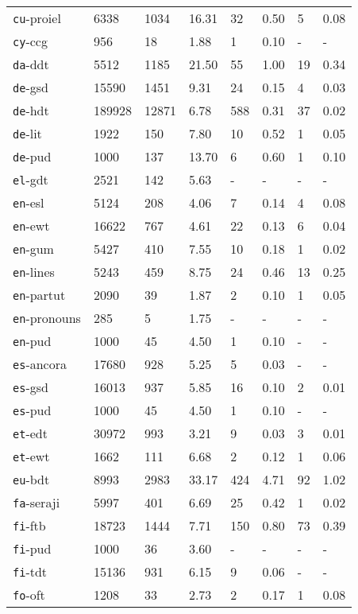 \begin{longtable}{|l|l|l|l|l|l|l|l|}
\texttt{cu}-proiel & 6338 & 1034 & 16.31 & 32 & 0.50 & 5 & 0.08\\
\texttt{cy}-ccg & 956 & 18 & 1.88 & 1 & 0.10 & - & -\\
\texttt{da}-ddt & 5512 & 1185 & 21.50 & 55 & 1.00 & 19 & 0.34\\
\texttt{de}-gsd & 15590 & 1451 & 9.31 & 24 & 0.15 & 4 & 0.03\\
\texttt{de}-hdt & 189928 & 12871 & 6.78 & 588 & 0.31 & 37 & 0.02\\
\texttt{de}-lit & 1922 & 150 & 7.80 & 10 & 0.52 & 1 & 0.05\\
\texttt{de}-pud & 1000 & 137 & 13.70 & 6 & 0.60 & 1 & 0.10\\
\texttt{el}-gdt & 2521 & 142 & 5.63 & - & - & - & -\\
\texttt{en}-esl & 5124 & 208 & 4.06 & 7 & 0.14 & 4 & 0.08\\
\texttt{en}-ewt & 16622 & 767 & 4.61 & 22 & 0.13 & 6 & 0.04\\
\texttt{en}-gum & 5427 & 410 & 7.55 & 10 & 0.18 & 1 & 0.02\\
\texttt{en}-lines & 5243 & 459 & 8.75 & 24 & 0.46 & 13 & 0.25\\
\texttt{en}-partut & 2090 & 39 & 1.87 & 2 & 0.10 & 1 & 0.05\\
\texttt{en}-pronouns & 285 & 5 & 1.75 & - & - & - & -\\
\texttt{en}-pud & 1000 & 45 & 4.50 & 1 & 0.10 & - & -\\
\texttt{es}-ancora & 17680 & 928 & 5.25 & 5 & 0.03 & - & -\\
\texttt{es}-gsd & 16013 & 937 & 5.85 & 16 & 0.10 & 2 & 0.01\\
\texttt{es}-pud & 1000 & 45 & 4.50 & 1 & 0.10 & - & -\\
\texttt{et}-edt & 30972 & 993 & 3.21 & 9 & 0.03 & 3 & 0.01\\
\texttt{et}-ewt & 1662 & 111 & 6.68 & 2 & 0.12 & 1 & 0.06\\
\texttt{eu}-bdt & 8993 & 2983 & 33.17 & 424 & 4.71 & 92 & 1.02\\
\texttt{fa}-seraji & 5997 & 401 & 6.69 & 25 & 0.42 & 1 & 0.02\\
\texttt{fi}-ftb & 18723 & 1444 & 7.71 & 150 & 0.80 & 73 & 0.39\\
\texttt{fi}-pud & 1000 & 36 & 3.60 & - & - & - & -\\
\texttt{fi}-tdt & 15136 & 931 & 6.15 & 9 & 0.06 & - & -\\
\texttt{fo}-oft & 1208 & 33 & 2.73 & 2 & 0.17 & 1 & 0.08\\

\end{longtable}
